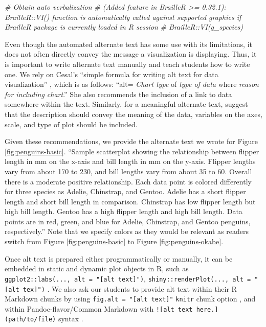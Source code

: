 \documentclass[12pt]{article}
\newenvironment{Shaded}{\begin{snugshade}}{\end{snugshade}}
\newcommand{\CommentTok}[1]{\textcolor[rgb]{0.56,0.35,0.01}{\textit{#1}}}
\begin{document}
\begin{Shaded}
\begin{Highlighting}[]
\CommentTok{\# Obtain auto verbalization}
\CommentTok{\# (Added feature in BrailleR \textgreater{}= 0.32.1): \textasciigrave{}BrailleR::VI()\textasciigrave{} function is automatically called against supported graphics if BrailleR package is currently loaded in R session}
\CommentTok{\# BrailleR::VI(g\_species)}
\end{Highlighting}
\end{Shaded}

Even though the automated alternate text has some use with its limitations, it does not often directly convey the message a visualization is displaying.
Thus, it is important to write alternate text manually and teach students how to write one.
We rely on Cesal's ``simple formula for writing alt text for data visualization'' \citeyearpar{cesal}, which is as follows: ``alt= \emph{Chart type} of \emph{type of data} where \emph{reason for including chart}.''
She also recommends the inclusion of a link to data somewhere within the text.
Similarly, for a meaningful alternate text, \citet{canelon} suggest that the description should convey the meaning of the data, variables on the axes, scale, and type of plot should be included.

Given these recommendations, we provide the alternate text we wrote for Figure \ref{fig:penguins-basic}. ``Sample scatterplot showing the relationship between flipper length in mm on the x-axis and bill length in mm on the y-axis. Flipper lengths vary from about 170 to 230, and bill lengths vary from about 35 to 60. Overall there is a moderate positive relationship. Each data point is colored differently for three species as Adelie, Chinstrap, and Gentoo. Adelie has a short flipper length and short bill length in comparison. Chinstrap has low flipper length but high bill length. Gentoo has a high flipper length and high bill length. Data points are in red, green, and blue for Adelie, Chinstrap, and Gentoo penguins, respectively.''
Note that we specify colors as they would be relevant as readers switch from Figure \ref{fig:penguins-basic} to Figure \ref{fig:penguins-okabe}.

Once alt text is prepared either programmatically or manually, it can be embedded in static and dynamic plot objects in R, such as \texttt{ggplot2::labs(...,\ alt\ =\ "{[}alt\ text{]}")},
\texttt{shiny::renderPlot(...,\ alt\ =\ "{[}alt\ tex{]}")} \citep{R-shiny}. We also ask our students to provide alt text within their R Markdown chunks by using \texttt{fig.alt\ =\ "{[}alt\ text{]}"} \texttt{knitr} chunk option \citep{knitr2014}, and within Pandoc-flavor/Common Markdown with \texttt{!{[}alt\ text\ here.{]}(path/to/file)} syntax \citep{macfarlanePandoc2022}.
\end{document}
